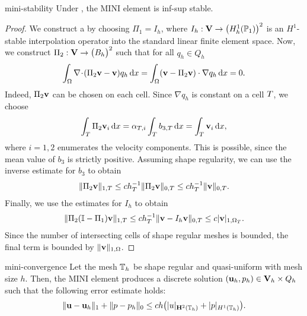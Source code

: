 \begin{Theorem}{mini-stability}
  Under ,
  the MINI element is inf-sup stable.
\end{Theorem}

\begin{proof}
  We construct a  by choosing
  $\Pi_1 = I_h$, where $I_h:\mathbf V\to \bigl(H^1_h(\mathbb P_1)\bigr)^2$ is an
  $H^1$-stable interpolation operator into the standard linear finite
  element space. Now, we construct $\Pi_2: \mathbf V \to \bigl(B_h\bigr)^2$
  such that for all $q_h\in Q_h$
  \begin{gather}
    \int_\Omega \nabla\!\cdot\!(\Pi_2 \mathbf v-\mathbf v) q_h \,\mathrm{d} x
    = \int_\Omega (\mathbf v-\Pi_2 \mathbf v)\cdot\nabla q_h\,\mathrm{d} x
    = 0.
  \end{gather}
  Indeed, $\Pi_2 \mathbf v$ can be chosen on each cell. Since $\nabla q_h$ is
  constant on a cell $T$, we choose
  \begin{gather}
    \int_T \Pi_2 \mathbf v_i \,\mathrm{d} x
    = \alpha_{T,i} \int_T b_{3,T}\,\mathrm{d} x
    = \int_T \mathbf v_i\,\mathrm{d} x,
  \end{gather}
  where $i=1,2$ enumerates the velocity components. This is possible,
  since the mean value of $b_3$ is strictly positive. Assuming shape
  regularity, we can use the inverse estimate for $b_3$ to obtain
  \begin{gather}
    \lVert\Pi_2 \mathbf v\rVert_{1,T}
    \le c h_T^{-1} \lVert\Pi_2 \mathbf v\rVert_{0,T}
    \le c h_T^{-1} \lVert\mathbf v\rVert_{0,T}.
  \end{gather}
  Finally, we use the estimates for $I_h$ to obtain
  \begin{gather}
    \lVert\Pi_2 (\mathbb I-\Pi_1) \mathbf v\rVert_{1,T}
    \le c h_T^{-1} \lVert\mathbf v-I_h \mathbf v\rVert_{0,T}
    \le c \lvert\mathbf v\rvert_{1,\Omega_T}.
  \end{gather}
  Since the number of intersecting cells of shape regular meshes is
  bounded, the final term is bounded by $\lVert\mathbf v\rVert_{1,\Omega}$.
\end{proof}

\begin{Theorem}{mini-convergence}
  Let the mesh $\mathbb T_h$ be shape regular and quasi-uniform with mesh
  size $h$. Then, the MINI element produces a discrete solution
  $(\mathbf u_h,p_h)\in \mathbf V_h\times Q_h$ such that the following error
  estimate holds:
  \begin{gather}
    \lVert\mathbf u - \mathbf u_h\rVert_1 + \lVert p-p_h\rVert_0
    \le c h \bigl(\lvert u\rvert_{\mathbf H^2(\mathbb T_h)} + \lvert p\rvert_{H^1(\mathbb T_h)}\bigr).
  \end{gather}
\end{Theorem}

